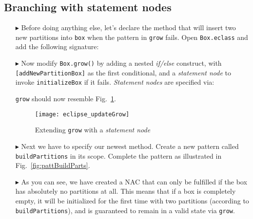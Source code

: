 \newpage
\hypertarget{conBran tex}{}
\subsection{Branching with statement nodes}
\texHeader

\begin{itemize}

\item[$\blacktriangleright$] Before doing anything else, let's declare the method that will insert two new partitions into \texttt{box} when the
pattern in \texttt{grow} fails. Open \texttt{Box.eclass} and add the following signature: 

\vspace{0.5cm}

\item[$\blacktriangleright$] Now modify \texttt{Box.grow()} by adding a nested \emph{if/else} construct, with \texttt{[addNewPartitionBox]} as the
first conditional, and a \emph{statement node} to invoke \texttt{initializeBox} if it fails. \emph{Statement nodes} are specified via:


\texttt{grow} should now resemble Fig.~\ref{fig:updateGrow}.

\vspace{0.5cm}

\begin{figure}[htp]
\begin{center}
  \texttt{[image: eclipse\_updateGrow]}
  \caption{Extending \texttt{grow} with a \emph{statement node}}
  \label{fig:updateGrow}
\end{center}
\end{figure}

\vspace{0.5cm}

\item[$\blacktriangleright$] Next we have to specify our newest method. Create a new pattern called \texttt{buildPartitions} in its scope. Complete
the pattern as illustrated in Fig.~\ref{fig:pattBuildParts}.

\item[$\blacktriangleright$] As you can see, we have created a NAC that can only be fulfilled if the box has absolutely no partitions at all. This means that if
a box is completely empty, it will be initialized for the first time with two partitions (according to \texttt{buildPartitions}), and is guaranteed to remain in
a valid state via \texttt{grow}.


\end{itemize}
